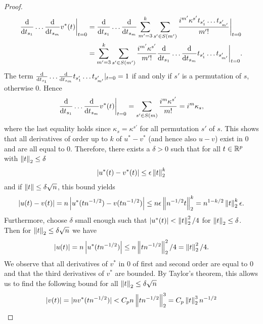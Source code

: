 \begin{proof}
    \begin{align*}
        \frac{\text{d}}{\text{d} t_{s_1}}\ldots\frac{\text{d}}{\text{d} t_{s_m}} v^*(t) \bigg|_{t=0}
        &= \frac{\text{d}}{\text{d} t_{s_1}}\ldots\frac{\text{d}}{\text{d} t_{s_m}} \sum_{m'=3}^k \sum_{s' \in S(m')} \frac{i^{m'}\kappa^{s'}t_{s'_1}\ldots t_{s'_{m'}}}{m'!} \bigg|_{t=0} \\
        &= \sum_{m'=3}^k \sum_{s' \in S(m')} \frac{i^{m'}\kappa^{s'}}{m'!} \frac{\text{d}}{\text{d} t_{s_1}}\ldots\frac{\text{d}}{\text{d} t_{s_m}}t_{s'_1}\ldots t_{s'_{m'}} \bigg|_{t=0}.
    \end{align*}
    The term $\frac{\text{d}}{\text{d} t_{s_1}}\ldots\frac{\text{d}}{\text{d} t_{s_m}}t_{s'_1}\ldots t_{s'_{m'}} |_{t=0} = 1$ if and only if $s'$ is a permutation of $s$, otherwise 0. Hence
    \begin{equation*}
        \frac{\text{d}}{\text{d} t_{s_1}}\ldots\frac{\text{d}}{\text{d} t_{s_m}} v^*(t) \bigg|_{t=0} 
        = \sum_{s' \in S(m)} \frac{i^m\kappa^{s'}}{m!}
        = i^m\kappa_s,
    \end{equation*}
    where the last equality holds since $\kappa_s = \kappa^{s'}$ for all permutation $s'$ of $s$. 
    This shows that all derivatives of order up to $k$ of $u^* - v^*$ (and hence also $u - v$) exist in 0 and are all equal to 0. Therefore, there exists a $\delta > 0$ such that for all $t \in {\mathbb{R}^p}$ with $\left\lVert t\right\rVert_2 \leq \delta$
    \begin{equation*}
        \left|u^*(t) - v^*(t)\right| \leq \epsilon\left\lVert t\right\rVert_2^k
    \end{equation*}
    and if $\left\lVert t\right\rVert \leq \delta \sqrt{n}$, this bound yields
    \begin{equation*}
        \left|u(t) - v(t)\right| = n\left|u^*(t n^{-1/2}) - v(t n^{-1/2})\right| \leq n\epsilon\left\lVert n^{-1/2}t\right\rVert_2^k = n^{1-k/2}\left\lVert t\right\rVert_2^k\epsilon.
    \end{equation*}
    Furthermore, choose $\delta$ small enough such that $\left|u^*(t)\right| < \left\lVert t\right\rVert_2^2/4$ for $\left\lVert t\right\rVert_2 \leq \delta$. Then for $\left\lVert t\right\rVert_2 \leq \delta\sqrt{n}$ we have
    \begin{equation*}
        \left|u(t)\right| = n\left|u^*(t n^{-1/2})\right| \leq n \left\lVert t n^{-1/2}\right\rVert_2^2/4 = \left\lVert t\right\rVert_2^2/4.
    \end{equation*}
    We observe that all derivatives of $v^*$ in 0 of first and second order are equal to 0 and that the third derivatives of $v^*$ are bounded. By Taylor's theorem, this allows us to find the following bound for all $\left\lVert t\right\rVert_2 \leq \delta \sqrt{n}$
    \begin{equation*}
        |v(t)| = |nv^*(t n^{-1/2})| < C_p n \left\lVert t n^{-1/2}\right\rVert_2^3 = C_p \left\lVert t\right\rVert_2^3 n^{-1/2}
    \end{equation*}

\end{proof}
